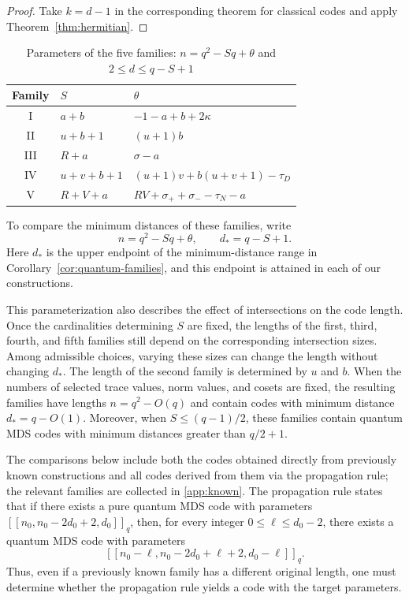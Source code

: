 \documentclass[preprint,12pt,a4paper]{elsarticle}
\newcommand{\qcode}[3]{\left[\!\left[#1,#2,#3\right]\!\right]_q}
\begin{document}
\begin{proof}
Take $k=d-1$ in the corresponding theorem for classical codes and apply Theorem~\ref{thm:hermitian}.
\end{proof}

\begin{table}[htbp]
\centering\small
\caption{Parameters of the five families: $n=q^2-Sq+\theta$ and $2\le d\le q-S+1$}
\label{tab:general-comparison-parameters}
\setlength{\tabcolsep}{5pt}
\begin{tabular}{cll}
\toprule
Family & $S$ & $\theta$\\
\midrule
I & $a+b$ & $-1-a+b+2\kappa$\\
II & $u+b+1$ & $(u+1)b$\\
III & $R+a$ & $\sigma-a$\\
IV & $u+v+b+1$ & $(u+1)v+b(u+v+1)-\tau_D$\\
V & $R+V+a$ & $RV+\sigma_++\sigma_- -\tau_N-a$\\
\bottomrule
\end{tabular}
\end{table}

To compare the minimum distances of these families, write
\begin{equation}\label{eq:comparison-parameters}
 n=q^2-Sq+\theta,\qquad d_*=q-S+1.
\end{equation}
Here $d_*$ is the upper endpoint of the minimum-distance range in Corollary~\ref{cor:quantum-families}, and this endpoint is attained in each of our constructions.

This parameterization also describes the effect of intersections on the code length. Once the cardinalities determining $S$ are fixed, the lengths of the first, third, fourth, and fifth families still depend on the corresponding intersection sizes. Among admissible choices, varying these sizes can change the length without changing $d_*$. The length of the second family is determined by $u$ and $b$. When the numbers of selected trace values, norm values, and cosets are fixed, the resulting families have lengths $n=q^2-O(q)$ and contain codes with minimum distance $d_*=q-O(1)$. Moreover, when $S\le(q-1)/2$, these families contain quantum MDS codes with minimum distances greater than $q/2+1$.

The comparisons below include both the codes obtained directly from previously known constructions and all codes derived from them via the propagation rule; the relevant families are collected in \ref{app:known}. The propagation rule \cite[Lemma~1.4]{FangFu2019} states that if there exists a pure quantum MDS code with parameters $\qcode{n_0}{n_0-2d_0+2}{d_0}$, then, for every integer $0\le\ell\le d_0-2$, there exists a quantum MDS code with parameters
\[
 \qcode{n_0-\ell}{n_0-2d_0+\ell+2}{d_0-\ell}.
\]
Thus, even if a previously known family has a different original length, one must determine whether the propagation rule yields a code with the target parameters.
\end{document}
